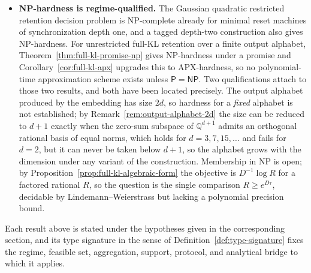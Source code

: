 \documentclass[12pt]{article}
\theoremstyle{definition}
\newcommand{\MistRI}{\operatorname{Mistakes}_{\mathrm{active,RI}}}
\begin{document}
\begin{itemize}[leftmargin=1.8em]
A direct-sum instance forces its two components on disjoint rounds, giving
$\MistRI(M)\ge S_M+C_M$, but no non-degenerate two-term decomposition of the
active complexity is available in the mistake currency: state identification in
a known minimal skeleton costs only $O_{|\mathcal O|}(\log M)$ mistakes
(Proposition~\ref{prop:esyncsi-log}).  Whether a genuine decomposition exists
in the experiment-length currency is
Open Problem~\ref{open:si-hard-family}.

\item \textbf{NP-hardness is regime-qualified.}
The Gaussian quadratic restricted retention decision problem is NP-complete
already for minimal reset machines of synchronization depth one, and a tagged
depth-two construction also gives NP-hardness.  For unrestricted full-KL
retention over a finite output alphabet,
Theorem~\ref{thm:full-kl-promise-np} gives NP-hardness under a promise and
Corollary~\ref{cor:full-kl-apx} upgrades this to APX-hardness, so no
polynomial-time approximation scheme exists unless $\mathsf P=\mathsf{NP}$.
Two qualifications attach to those two results, and both have been located
precisely.  The output alphabet produced by the embedding has size $2d$, so
hardness for a \emph{fixed} alphabet is not established; by
Remark~\ref{rem:output-alphabet-2d} the size can be reduced to $d+1$ exactly
when the zero-sum subspace of $\mathbb Q^{d+1}$ admits an orthogonal rational
basis of equal norms, which holds for $d=3,7,15,\dots$ and fails for $d=2$, but
it can never be taken below $d+1$, so the alphabet grows with the dimension
under any variant of the construction.  Membership in NP is open; by
Proposition~\ref{prop:full-kl-algebraic-form} the objective is $D^{-1}\log R$
for a factored rational $R$, so the question is the single comparison
$R\ge e^{D\tau}$, decidable by Lindemann--Weierstrass but lacking a polynomial
precision bound.
\end{itemize}

Each result above is stated under the hypotheses given in the corresponding
section, and its type signature in the sense of
Definition~\ref{def:type-signature} fixes the regime, feasible set,
aggregation, support, protocol, and analytical bridge to which it applies.
\end{document}
